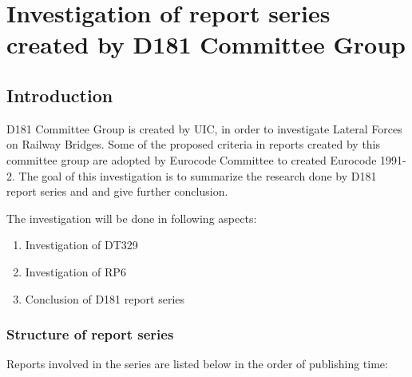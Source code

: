 

\chapter{Investigation of report series created by D181 Committee Group}\label{sec:D181reportseries}


\section{Introduction}

D181 Committee Group is created by UIC, in order to investigate Lateral Forces on Railway Bridges. Some of the proposed criteria in reports created by this committee group are adopted by Eurocode Committee to created Eurocode 1991-2. The goal of this investigation is to summarize the research done by D181 report series and and give further conclusion.

The investigation will be done in following aspects:

\begin{enumerate}
    \item Investigation of DT329
    \item Investigation of RP6
    \item Conclusion of D181 report series
\end{enumerate}

\subsection{Structure of report series}

Reports involved in the series are listed below in the order of publishing time:

